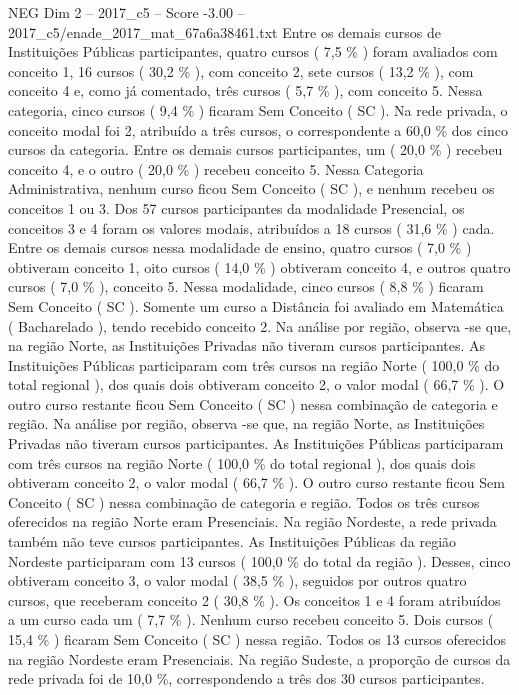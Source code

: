 \begin{textsample}{NEG Dim 2 – 2017\_c5 – Score -3.00 – 2017\_c5/enade\_2017\_mat\_67a6a38461.txt}
Entre os demais cursos de Instituições Públicas participantes, quatro cursos ( 7,5 \% ) foram avaliados com conceito 1, 16 cursos ( 30,2 \% ), com conceito 2, sete cursos ( 13,2 \% ), com conceito 4 e, como já comentado, três cursos ( 5,7 \% ), com conceito 5.
Nessa categoria, cinco cursos ( 9,4 \% ) ficaram Sem Conceito ( SC ).
Na rede privada, o conceito modal foi 2, atribuído a três cursos, o correspondente a 60,0 \% dos cinco cursos da categoria.
Entre os demais cursos participantes, um ( 20,0 \% ) recebeu conceito 4, e o outro ( 20,0 \% ) recebeu conceito 5.
Nessa Categoria Administrativa, nenhum curso ficou Sem Conceito ( SC ), e nenhum recebeu os conceitos 1 ou 3.
Dos 57 cursos participantes da modalidade Presencial, os conceitos 3 e 4 foram os valores modais, atribuídos a 18 cursos ( 31,6 \% ) cada.
Entre os demais cursos nessa modalidade de ensino, quatro cursos ( 7,0 \% ) obtiveram conceito 1, oito cursos ( 14,0 \% ) obtiveram conceito 4, e outros quatro cursos ( 7,0 \% ), conceito 5.
Nessa modalidade, cinco cursos ( 8,8 \% ) ficaram Sem Conceito ( SC ).
Somente um curso a Distância foi avaliado em Matemática ( Bacharelado ), tendo recebido conceito 2.
Na análise por região, observa -se que, na região Norte, as Instituições Privadas não tiveram cursos participantes.
As Instituições Públicas participaram com três cursos na região Norte ( 100,0 \% do total regional ), dos quais dois obtiveram conceito 2, o valor modal ( 66,7 \% ).
O outro curso restante ficou Sem Conceito ( SC ) nessa combinação de categoria e região.
Na análise por região, observa -se que, na região Norte, as Instituições Privadas não tiveram cursos participantes.
As Instituições Públicas participaram com três cursos na região Norte ( 100,0 \% do total regional ), dos quais dois obtiveram conceito 2, o valor modal ( 66,7 \% ).
O outro curso restante ficou Sem Conceito ( SC ) nessa combinação de categoria e região.
Todos os três cursos oferecidos na região Norte eram Presenciais.
Na região Nordeste, a rede privada também não teve cursos participantes.
As Instituições Públicas da região Nordeste participaram com 13 cursos ( 100,0 \% do total da região ).
Desses, cinco obtiveram conceito 3, o valor modal ( 38,5 \% ), seguidos por outros quatro cursos, que receberam conceito 2 ( 30,8 \% ).
Os conceitos 1 e 4 foram atribuídos a um curso cada um ( 7,7 \% ).
Nenhum curso recebeu conceito 5.
Dois cursos ( 15,4 \% ) ficaram Sem Conceito ( SC ) nessa região.
Todos os 13 cursos oferecidos na região Nordeste eram Presenciais.
Na região Sudeste, a proporção de cursos da rede privada foi de 10,0 \%, correspondendo a três dos 30 cursos participantes.

\end{textsample}
